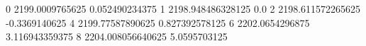 0 2199.0009765625 0.052490234375
1 2198.948486328125 0.0
2 2198.611572265625 -0.3369140625
4 2199.77587890625 0.827392578125
6 2202.0654296875 3.116943359375
8 2204.008056640625 5.0595703125
